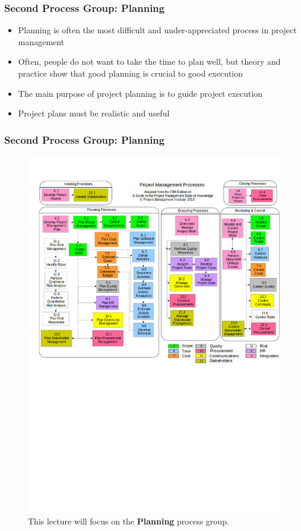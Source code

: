 \documentclass{beamer}
\begin{document}

\begin{frame}
\frametitle{Second Process Group: Planning}
\begin{itemize}
\item Planning is often the most difficult and under-appreciated process in project management
\item Often, people do not want to take the time to plan well, but theory and practice show that good planning is crucial to good execution
\item The main purpose of project planning is to guide project execution
\item Project plans must be realistic and useful
\end{itemize}
\end{frame}


\begin{frame}
\frametitle{Second Process Group: Planning}
\begin{figure}
\caption{This lecture will focus on the \textbf{Planning} process group.}
\vspace{-0.8cm}
\includegraphics[scale=0.3]{mapping}
\end{figure}
\end{frame}
\end{document}

